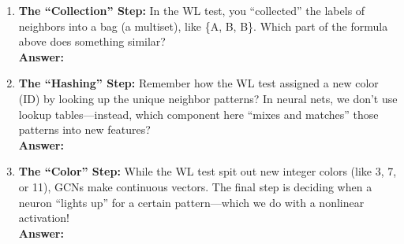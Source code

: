 \documentclass[a4paper, 12pt]{extarticle}
\begin{document}
\begin{enumerate}
    \item \textbf{The ``Collection'' Step:} In the WL test, you ``collected'' the labels of neighbors into a bag (a multiset), like \{A, B, B\}. Which part of the formula above does something similar? \\
    \vspace{0.5cm}
    \textbf{Answer:} \underline{\hspace{8cm}}

    \item \textbf{The ``Hashing'' Step:} Remember how the WL test assigned a new color (ID) by looking up the unique neighbor patterns? In neural nets, we don't use lookup tables---instead, which component here ``mixes and matches'' those patterns into new features? \\
    \vspace{0.5cm}
    \textbf{Answer:} \underline{\hspace{8cm}}

    \item \textbf{The ``Color'' Step:} While the WL test spit out new integer colors (like 3, 7, or 11), GCNs make continuous vectors. The final step is deciding when a neuron ``lights up'' for a certain pattern---which we do with a nonlinear activation! \\
    \vspace{0.5cm}
    \textbf{Answer:} \underline{\hspace{8cm}}
\end{enumerate}
\end{document}
